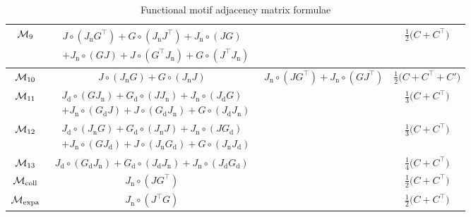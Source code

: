 \begin{table}[H]
\begin{tabular}{ |c|c|c|c| }
		\hline
		
		$\mathcal{M}_9$ & \rule{0pt}{1.9em}$\displaystyle\begin{aligned}
						& J \circ (J_\mathrm{n} G^\top) + G \circ (J_\mathrm{n} J^\top) + J_\mathrm{n} \circ (J G) \\
						& + J_\mathrm{n} \circ (G J) + J \circ (G^\top J_\mathrm{n}) + G \circ (J^\top J_\mathrm{n})
					\end{aligned}$\rule[-1.3em]{0pt}{1em} & & $\frac{1}{2} \big(C + C^\top\big)$ \\
					
		\hline
		
		$\mathcal{M}_{10}$ & $J \circ (J_\mathrm{n} G) + G \circ (J_\mathrm{n} J)$ & $J_\mathrm{n} \circ (J G^\top) + J_\mathrm{n} \circ (G J^\top)$ & $\frac{1}{2} \big(C + C^\top + C' \big)$ \\
		
		\hline
		
		$\mathcal{M}_{11}$ & \rule{0pt}{1.9em}$\displaystyle\begin{aligned}
						& J_\mathrm{d} \circ (G J_\mathrm{n}) + G_\mathrm{d} \circ (J J_\mathrm{n}) + J_\mathrm{n} \circ (J_\mathrm{d} G) \\
						&  + J_\mathrm{n} \circ (G_\mathrm{d} J) + J \circ (G_\mathrm{d} J_\mathrm{n}) + G \circ (J_\mathrm{d} J_\mathrm{n})
					\end{aligned}$\rule[-1.3em]{0pt}{1em} & & $\frac{1}{3} \big(C + C^\top\big)$ \\
					
		\hline
		
		$\mathcal{M}_{12}$ & \rule{0pt}{1.9em}$\displaystyle\begin{aligned}
						& J_\mathrm{d} \circ (J_\mathrm{n} G) + G_\mathrm{d} \circ (J_\mathrm{n} J) + J_\mathrm{n} \circ (J G_\mathrm{d}) \\
						& + J_\mathrm{n} \circ (G J_\mathrm{d}) + J \circ (J_\mathrm{n} G_\mathrm{d}) + G \circ (J_\mathrm{n} J_\mathrm{d})
					\end{aligned}$\rule[-1.3em]{0pt}{1em} & & $ \frac{1}{3} \big(C + C^\top\big)$ \\
					
		\hline

		$\mathcal{M}_{13}$ & $J_\mathrm{d} \circ (G_\mathrm{d} J_\mathrm{n}) + G_\mathrm{d} \circ (J_\mathrm{d} J_\mathrm{n}) + J_\mathrm{n} \circ (J_\mathrm{d} G_\mathrm{d})$ & & $\frac{1}{4} \big(C + C^\top \big)$ \\
		
		\hline
		
		$\mathcal{M}_\mathrm{coll}$ & $J_\mathrm{n} \circ (J G^\top)$ & & $\frac{1}{2} \big( C + C^\top \big)$ \\
		
		\hline
		
		$\mathcal{M}_\mathrm{expa}$ & $J_\mathrm{n} \circ (J^\top G)$ & & $\frac{1}{2} \big( C + C^\top \big)$ \\
		
		\hline

	\end{tabular}
	\caption{Functional motif adjacency matrix formulae}
	\label{tab:motif_adj_mat_table}
\end{table}
